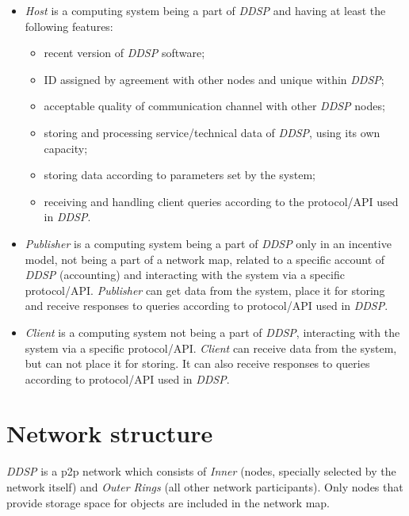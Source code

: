 \documentclass[a4paper, 11pt]{article}
\begin{document}
\begin{itemize}[]

\item \textit{Host} is a computing system being a part of \textit{DDSP} and having at least the following features:
  \begin{itemize}%
\item recent version of \textit{DDSP} software;
\item ID assigned by agreement with other nodes and unique within \textit{DDSP};
\item acceptable quality of communication channel with other \textit{DDSP} nodes;
\item storing and processing service/technical data of \textit{DDSP}, using its own capacity;
\item storing data according to parameters set by the system;
\item receiving and handling client queries according to the protocol/API used in \textit{DDSP}.

\end{itemize}

\item \textit{Publisher} is a computing system being a part of \textit{DDSP} 
  only in an incentive model, not being a part of a network map, related to a
  specific account of \textit{DDSP} (accounting) and
  interacting with the system via a specific protocol/API. \textit{Publisher} can
  get data from the system, place it for storing and receive responses to
  queries according to protocol/API used in \textit{DDSP}.
\item \textit{Client} is a computing system not being a part of
  \textit{DDSP}, interacting with the system via a
  specific protocol/API. \textit{Client} can receive data from the system, but can
  not place it for storing. It can also receive responses to queries according
  to protocol/API used in \textit{DDSP}.

\end{itemize}

\section{Network structure}

\textit{DDSP} is a p2p network which consists of
\textit{Inner} (nodes, specially selected by the network itself) and
\textit{Outer Rings} (all other network participants). Only nodes that provide
storage space for objects are included in the network map.
\end{document}
